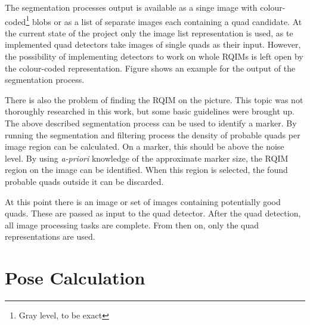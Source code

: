 The segmentation processes output is available as a singe image with colour-coded\footnote{Gray level, to be exact} blobs or as a list of separate images each containing a quad candidate.
At the current state of the project only the image list representation is used, as te implemented quad detectors take images of single quads as their input.
However, the possibility of implementing detectors to work on whole RQIMs is left open by the colour-coded representation.
Figure  shows an example for the output of the segmentation process.

There is also the problem of finding the RQIM on the picture.
This topic was not thoroughly researched in this work, but some basic guidelines were brought up.
The above described segmentation process can be used to identify a marker.
By running the segmentation and filtering process the density of probable quads per image region can be calculated.
On a marker, this should be above the noise level.
By using \textit{a-priori} knowledge of the approximate marker size, the RQIM region on the image can be identified.
When this region is selected, the found probable quads outside it can be discarded.

At this point there is an image or set of images containing potentially good quads.
These are passed as input to the quad detector.
After the quad detection, all image processing tasks are complete.
From then on, only the quad representations are used.

\section{Pose Calculation}

